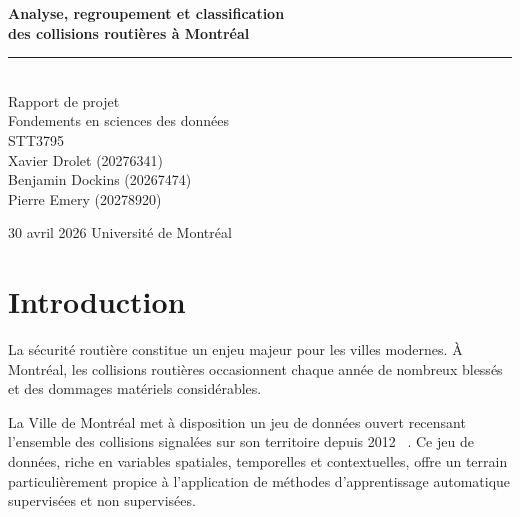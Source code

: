 \documentclass[11pt]{article}
\begin{document}
 
\begin{titlepage}
  \centering
  \vspace*{2cm}
  {\LARGE \textbf{Analyse, regroupement et classification\\
  des collisions routières à Montréal}\\[0.5em]}
  \rule{\linewidth}{0.4pt}\\[1.5em]
  {\large Rapport de projet}\\[1em]
  {\large Fondements en sciences des données}\\[2em]
  {\large  STT3795}\\[2em]

  {\large
  Xavier Drolet (20276341)\\
  Benjamin Dockins (20267474)\\
  Pierre Emery (20278920)\\[2em]}
 
  {\large 30 avril 2026}
  \vfill
  {\large Université de Montréal}
\end{titlepage}
 
\tableofcontents
\newpage
 
\section{Introduction}
 
%
 
La sécurité routière constitue un enjeu majeur pour les villes modernes.
À Montréal, les collisions routières occasionnent chaque année de nombreux
blessés et des dommages matériels considérables.
 
La Ville de Montréal met à disposition un jeu de données ouvert recensant
l'ensemble des collisions signalées sur son territoire depuis 2012 ~\cite{donnees_mtl}.
Ce jeu de données, riche en variables spatiales, temporelles et contextuelles,
offre un terrain particulièrement propice à l'application de méthodes
d'apprentissage automatique supervisées et non supervisées.
 
\end{document}
